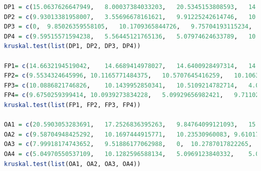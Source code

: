 \documentclass{article}
\begin{document}
\begin{lstlisting}[language=R, caption= C\'odigo utilizado para hacer pruebas de Kurskal-Wallis (N\'ucleos).]
DP1 = c(15.0637626647949,	8.00037384033203,	20.5345153808593,	14.9371623992919,	15.2616500854492,	15.5577659606933,	13.9107704162597,	19.8197364807128,	19.3409919738769)
DP2 = c(9.93013381958007,	3.55696678161621,	9.91225242614746,	10.1029872894287,	9.59086418151855,	10.1222991943359,	14.8596763610839,	15.1095390319824,	5.00893592834472)
DP3 = c(0,	9.85026359558105,	10.1709365844726,	9.75704193115234,	9.92989540100097,	10.394811630249,	10.3027820587158,	8.60190391540527,	5.08999824523925)
DP4 = c(9.59515571594238,	5.56445121765136,	5.07974624633789,	10.1842880249023,	9.59181785583496,	0,	5.00750541687011,	10.0986957550048,	10.1239681243896)
kruskal.test(list(DP1, DP2, DP3, DP4))

FP1= c(14.6632194519042,	14.6689414978027,	14.6400928497314,	14.7817134857177,	10.1368427276611,	16.0033702850341,	15.1014328002929,	14.5940780639648,	19.763708114624)
FP2= c(9.5534324645996,	10.1165771484375,	10.5707645416259,	10.1063251495361,	10.0808143615722,	9.58919525146484,	9.85145568847656,	11.9268894195556,	9.95707511901855)
FP3= c(10.0886821746826,	10.1439952850341,	10.5109214782714,	4.04214859008789,	10.0753307342529,	9.83428955078125,	9.97304916381835,	10.3750228881835,	9.69386100769042)
FP4= c(9.6750259399414,	10.0939273834228,	5.09929656982421,	9.71102714538574,	9.9799633026123,	10.0970268249511,	0,	8.00085067749023,	9.92918014526367)
kruskal.test(list(FP1, FP2, FP3, FP4))

OA1 = c(20.5903053283691,	17.2526836395263,	9.84764099121093,	15.1457786560058,	15.122652053833,	15.3250694274902,	19.301414489746,	22.6647853851318,	13.5760307312011)
OA2 = c(9.58704948425292,	10.1697444915771,	10.23530960083,	9.61017608642578,	9.20867919921875,	9.60993766784667,	9.87768173217773,	9.60707664489746,	9.50002670288085)
OA3 = c(7.99918174743652,	9.51886177062988,	0,	10.2787017822265,	10.3039741516113,	8.00061225891113,	14.5168304443359,	9.90939140319824,	0)
OA4 = c(5.04970550537109,	10.1282596588134,	5.0969123840332,	5.04279136657714,	10.2267265319824,	5.08332252502441,	5.0661563873291,	9.28521156311035,	0)
kruskal.test(list(OA1, OA2, OA3, OA4))
\end{lstlisting}
\end{document}
